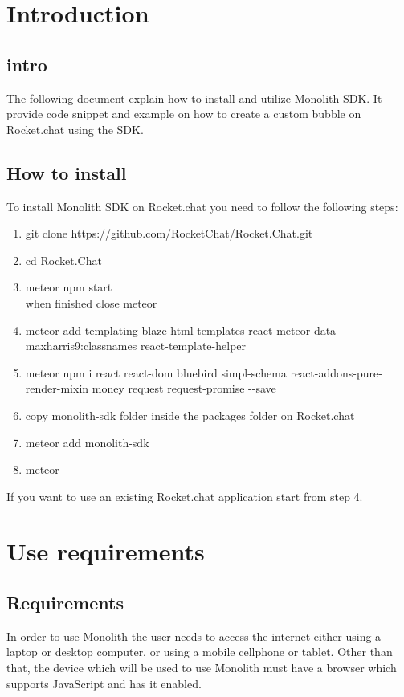 \section{Introduction}
\subsection{intro}
The following document explain how to install and utilize Monolith SDK.
It provide code snippet and example on how to create a custom bubble on Rocket.chat using the SDK.

\subsection{How to install}
To install Monolith SDK on Rocket.chat you need to follow the following steps:
\begin{enumerate}
    \item git clone https://github.com/RocketChat/Rocket.Chat.git
    \item cd Rocket.Chat
    \item meteor npm start \\ when finished close meteor
    \item meteor add templating blaze-html-templates react-meteor-data maxharris9:classnames react-template-helper	
    \item meteor npm i react react-dom bluebird simpl-schema react-addons-pure-render-mixin money request request-promise  -{}-save
    \item copy monolith-sdk folder inside the packages folder on Rocket.chat
    \item meteor add monolith-sdk
    \item meteor
\end{enumerate}

\begin{flushleft}
If you want to use an existing Rocket.chat application start from step 4.
\end{flushleft}

\section{Use requirements}

\subsection{Requirements}
In order to use Monolith the user needs to access the internet either using a laptop or desktop computer, or using a mobile cellphone or tablet. Other than that, the device which will be used to use Monolith must have a browser which supports JavaScript and has it enabled.

